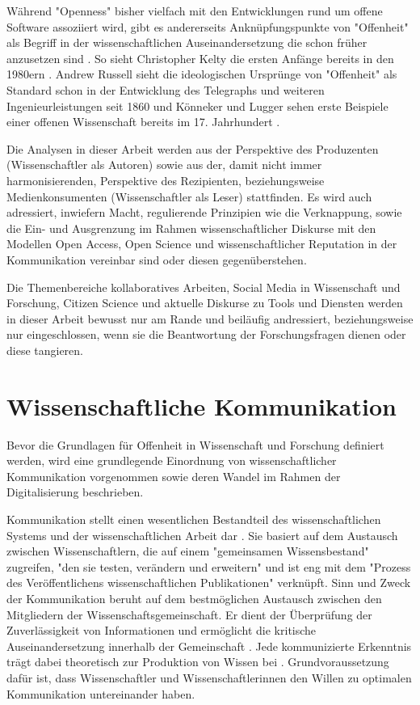 Während "Openness" bisher vielfach mit den Entwicklungen rund um offene Software assoziiert wird, gibt es andererseits Anknüpfungspunkte von "Offenheit" als Begriff in der wissenschaftlichen Auseinandersetzung die schon früher anzusetzen sind \cite{Tkacz_2014}. So sieht Christopher Kel­ty die ersten Anfänge bereits in den 1980ern \cite{kelty_2008_two_bits}. Andrew Russell sieht die ideologischen Ursprünge von "Offenheit" als Standard schon in der Entwicklung des Telegraphs und weiteren Ingenieurleistungen seit 1860 \cite{Russell_2014} und Könneker und Lugger sehen erste Beispiele einer offenen Wissenschaft bereits im 17. Jahrhundert \cite{Konneker_2013}.

Die Analysen in dieser Arbeit werden aus der Perspektive des Produzenten (Wissenschaftler als Autoren) sowie aus der, damit nicht immer harmonisierenden, Perspektive des Rezipienten, beziehungsweise Medienkonsumenten (Wissenschaftler als Leser) stattfinden. Es wird auch adressiert, inwiefern Macht, regulierende Prinzipien wie die Verknappung, sowie die Ein- und Ausgrenzung im Rahmen wissenschaftlicher Diskurse mit den Modellen Open Access, Open Science und wissenschaftlicher Reputation in der Kommunikation vereinbar sind oder diesen gegenüberstehen.

Die Themenbereiche kollaboratives Arbeiten, Social Media in Wissenschaft und Forschung, Citizen Science und aktuelle Diskurse zu Tools und Diensten werden in dieser Arbeit bewusst nur am Rande und beiläufig andressiert, beziehungsweise nur eingeschlossen, wenn sie die Beantwortung der Forschungsfragen dienen oder diese tangieren.

\section{Wissenschaftliche Kommunikation}

Bevor die Grundlagen für Offenheit in Wissenschaft und Forschung definiert werden, wird eine grundlegende Einordnung von wissenschaftlicher Kommunikation vorgenommen sowie deren Wandel im Rahmen der Digitalisierung beschrieben.

Kommunikation stellt einen wesentlichen Bestandteil des wissenschaftlichen Systems und der wissenschaftlichen Arbeit dar \cite{garvey_2014_communication} \cite[:63]{Luhmann1998}. Sie basiert auf dem Austausch zwischen Wissenschaftlern, die auf einem "gemeinsamen Wissensbestand" zugreifen, "den sie testen, verändern und erweitern" \cite{Gl_ser_2007} und ist eng mit dem "Prozess des Veröffentlichens wissenschaftlichen Publikationen" \cite{weller2011twitter} verknüpft. Sinn und Zweck der Kommunikation beruht auf dem bestmöglichen Austausch zwischen den Mitgliedern der Wissenschaftsgemeinschaft. Er dient der Überprüfung der Zuverlässigkeit von Informationen und ermöglicht die kritische Auseinandersetzung innerhalb der Gemeinschaft \cite{fox_1983_publication}. Jede kommunizierte Erkenntnis trägt dabei theoretisch zur Produktion von Wissen bei \cite{kaden_2009_library}. Grundvoraussetzung dafür ist, dass Wissenschaftler und Wissenschaftlerinnen den Willen zu optimalen Kommunikation untereinander haben.

